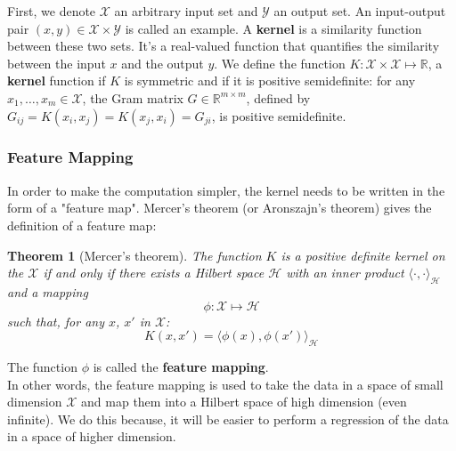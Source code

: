 \documentclass[a4paper, 11pt]{article}
\newtheorem{theorem}{Theorem}
\begin{document}
First, we denote $\mathcal{X}$ an arbitrary input set and $\mathcal{Y}$ an output set. An input-output pair $(x,y) \in \mathcal{X} \times \mathcal{Y}$ is called an example. A {\bf kernel} is a similarity function between these two sets. It's a real-valued function that quantifies the similarity between the input $x$ and the output $y$. We define the function 
$K: \mathcal{X}\times\mathcal{X} \mapsto \mathbb{R}$, a {\bf kernel} function if $K$ is symmetric and if it is positive semidefinite: for any $x_1, \ldots, x_m \in \mathcal{X}$, the Gram matrix $G\in \mathbb{R}^{m\times m}$, defined by $G_{ij} = K(x_i,x_j) = K(x_j,x_i) = G_{ji}$, is positive semidefinite.

\subsubsection{Feature Mapping}

In order to make the computation simpler, the kernel needs to be written in the form of a "feature map". Mercer's theorem (or Aronszajn's theorem) gives the definition of a feature map:
\begin{theorem} [Mercer's theorem]
The function $K$ is a positive definite kernel on the $\mathcal{X}$ if and only if there exists a Hilbert space $\mathcal{H}$ with an inner product $\langle \cdot,\cdot\rangle_{\mathcal{H}}$ and a mapping
\[
\phi: \mathcal{X}\mapsto\mathcal{H}
\]
such that, for any $x$, $x'$ in $\mathcal{X}$:
\[
K(x,x') = \langle\phi(x),\phi(x')\rangle_{\mathcal{H}}
\]
\end{theorem}
The function $\phi$ is called the {\bf feature mapping}.
\\
In other words, the feature mapping is used to take the data in a space of small dimension $\mathcal{X}$ and map them into a Hilbert space of high dimension (even infinite). We do this because, it will be easier to perform a regression of the data in a space of higher dimension.
\end{document}
